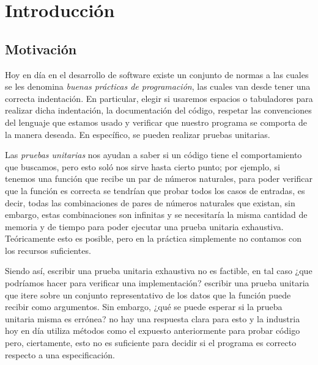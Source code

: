 \chapter{Introducción}

\section{Motivación}
\label{motivation}
Hoy en día en el desarrollo de software existe un conjunto de normas a las cuales se les 
denomina \textit{buenas pr\'acticas de programaci\'on}, las cuales van desde tener una correcta
indentaci\'on. En particular, elegir si usaremos espacios o tabuladores para realizar dicha 
indentaci\'on, la documentaci\'on del c\'odigo, respetar las convenciones del lenguaje que estamos 
usado y verificar que nuestro programa se comporta de la manera deseada. En espec\'ifico, se pueden 
realizar pruebas unitarias.

Las \textit{pruebas unitarias} nos ayudan a saber si un código tiene el comportamiento
que buscamos, pero esto sol\'o nos sirve hasta cierto punto; por ejemplo, si tenemos una funci\'on
que recibe un par de números naturales, para poder verificar que la funci\'on es correcta se 
tendrían que probar todos los casos de entradas, es decir, todas las combinaciones de pares de 
números naturales que existan, sin embargo, estas combinaciones son infinitas y se necesitaría la 
misma cantidad de memoria y de tiempo para poder ejecutar una prueba unitaria exhaustiva. 
Teóricamente esto es posible, pero en la pr\'actica simplemente no contamos con los recursos 
suficientes.

Siendo as\'i, escribir una prueba unitaria exhaustiva no es factible, en tal caso ¿que podríamos
hacer para verificar una implementaci\'on? escribir una prueba unitaria que itere sobre un conjunto
representativo de los datos que la funci\'on puede recibir como argumentos. Sin embargo, ¿qu\'e se 
puede esperar si la prueba unitaria misma es errónea? no hay una respuesta clara para esto y la 
industria hoy en día utiliza métodos como el expuesto anteriormente para probar c\'odigo pero, 
ciertamente, esto no es suficiente para decidir si el programa es correcto respecto a una 
especificaci\'on.

